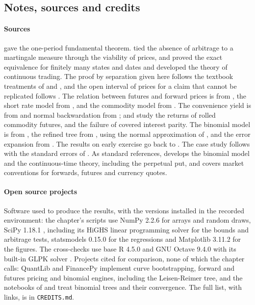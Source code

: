 \begin{chapterrefs}
\section{Notes, sources and credits}
\label{sec4:credits}

\paragraph{Sources}
\textcite{ross1978} gave the one-period fundamental theorem. \textcite{harrison1979} tied the
absence of arbitrage to a martingale measure through the viability of prices, and
\textcite{harrison1981} proved the exact equivalence for finitely many states and dates and developed
the theory of continuous trading. The proof by separation given
here follows the textbook treatments of \textcite{follmer2016} and \textcite{duffie2001}, and the
open interval of prices for a claim that cannot be replicated follows \textcite{follmer2016}. The relation between futures and forward prices is from \textcite{cox1981}, the short rate
model from \textcite{vasicek1977}, and the commodity model from \textcite{schwartz1997}. The convenience yield is from \textcite{kaldor1939} and normal backwardation
from \textcite{keynes1930}; \textcite{gorton2006} and \textcite{erb2006} study the returns of rolled
commodity futures, and \textcite{du2018} the failure of covered interest parity. The binomial model is
from \textcite{cox1979}, the refined tree from \textcite{leisen1996}, using the normal approximation
of \textcite{peizer1968}, and the error expansion from \textcite{diener2004}. The results on early
exercise go back to \textcite{merton1973}. The case study follows \textcite{fama1987} with the
standard errors of \textcite{newey1987}. As standard references, \textcite{shreve2004a} develops the
binomial model and \textcite{shreve2004} the continuous-time theory, including the perpetual put, and
\textcite{hull2022} covers market conventions for forwards, futures and currency quotes.

\paragraph{Open source projects}
Software used to produce the results, with the versions installed in the recorded environment: the
chapter's scripts use NumPy 2.2.6 \parencite{numpy} for arrays and random draws, SciPy 1.18.1 \parencite{scipy},
including its HiGHS linear programming solver for the bounds and arbitrage tests, statsmodels 0.15.0
\parencite{statsmodels} for the regressions and Matplotlib 3.11.2 \parencite{matplotlib} for the
figures. The cross-checks use base R 4.5.0 \parencite{rcore} and GNU Octave 9.4.0 with its built-in GLPK
solver \parencite{octave}. Projects cited for comparison, none of which the chapter calls: QuantLib
\parencite{quantlib} and FinancePy \parencite{financepy} implement curve bootstrapping, forward and
futures pricing and binomial engines, including the Leisen-Reimer tree, and the notebooks of
\textcite{cantaro86} and \textcite{py4fi} treat binomial trees and their convergence. The full list,
with links, is in \texttt{CREDITS.md}.


\end{chapterrefs}
